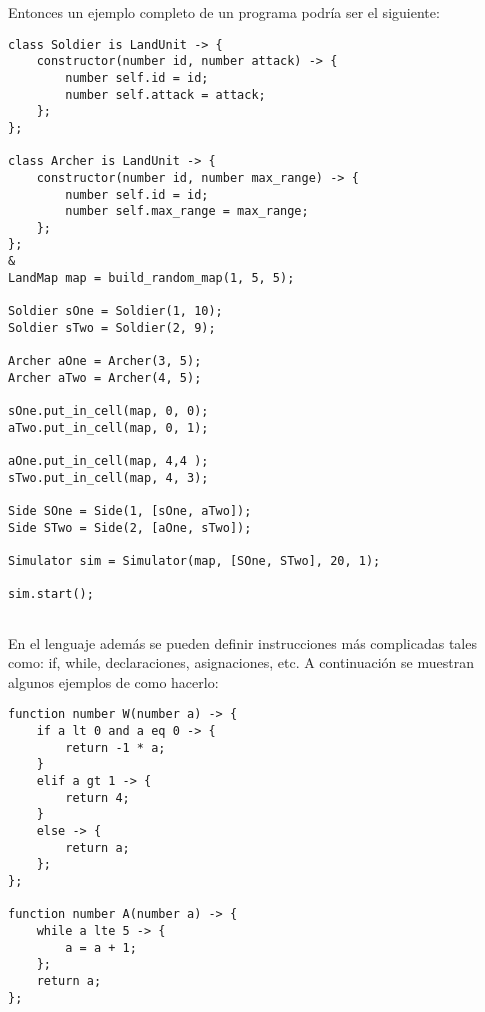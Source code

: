 Entonces un ejemplo completo de un programa podr\'ia ser el siguiente:

\begin{verbatim}
class Soldier is LandUnit -> {
    constructor(number id, number attack) -> {
        number self.id = id;
        number self.attack = attack;
    };
};

class Archer is LandUnit -> {
    constructor(number id, number max_range) -> {
        number self.id = id;
        number self.max_range = max_range;
    };
};
&
LandMap map = build_random_map(1, 5, 5);

Soldier sOne = Soldier(1, 10);
Soldier sTwo = Soldier(2, 9);

Archer aOne = Archer(3, 5);
Archer aTwo = Archer(4, 5);

sOne.put_in_cell(map, 0, 0);
aTwo.put_in_cell(map, 0, 1);

aOne.put_in_cell(map, 4,4 );
sTwo.put_in_cell(map, 4, 3);

Side SOne = Side(1, [sOne, aTwo]);
Side STwo = Side(2, [aOne, sTwo]);

Simulator sim = Simulator(map, [SOne, STwo], 20, 1);

sim.start();
	
\end{verbatim}

En el lenguaje adem\'as se pueden definir instrucciones m\'as complicadas tales como: if, while, declaraciones, asignaciones, etc. A continuaci\'on se muestran algunos ejemplos de como hacerlo:

\begin{verbatim}
function number W(number a) -> { 
    if a lt 0 and a eq 0 -> { 
        return -1 * a;  
    } 
    elif a gt 1 -> {
        return 4;
    } 
    else -> { 
        return a; 
    }; 
};

function number A(number a) -> { 
    while a lte 5 -> {
        a = a + 1;
    }; 
    return a;
};
\end{verbatim} 


